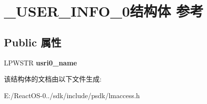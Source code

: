 \hypertarget{struct___u_s_e_r___i_n_f_o__0}{}\section{\+\_\+\+U\+S\+E\+R\+\_\+\+I\+N\+F\+O\+\_\+0结构体 参考}
\label{struct___u_s_e_r___i_n_f_o__0}
\subsection*{Public 属性}
\begin{DoxyCompactItemize}
\item 
\mbox{\label{struct___u_s_e_r___i_n_f_o__0_ad0b95707af03e866a90b38f10e235117}} 
L\+P\+W\+S\+TR {\bfseries usri0\+\_\+name}
\end{DoxyCompactItemize}


该结构体的文档由以下文件生成\+:\begin{DoxyCompactItemize}
\item 
E\+:/\+React\+O\+S-\/0../sdk/include/psdk/lmaccess.\+h\end{DoxyCompactItemize}
